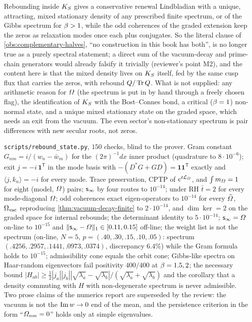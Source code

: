 \begin{observation}
\label{obs:rebound-both-halves-scope}
Rebounding inside $K_S$ gives a conservative renewal Lindbladian with a unique, attracting, mixed
stationary density of any prescribed finite spectrum, or of the Gibbs spectrum for $\beta>1$,
while the odd coherences of the graded extension keep the zeros as relaxation modes once each plus
conjugates. So the literal clause of \cref{obs:complementary-halves}, ``no construction in this book has
both'', is no longer true as a purely spectral statement; a direct sum of the vacuum-decay and
prime-chain generators would already falsify it trivially (reviewer's point M2), and the content here
is that the mixed density lives on $K_S$ itself, fed by the same cusp flux that carries the zeros,
with rebound $Q/\operatorname{Tr} Q$. What is not supplied: any arithmetic reason
for $\varOmega$ (the spectrum is put in by hand through a freely chosen flag), the identification of $K_S$
with the Bost--Connes bond, a critical ($\beta = 1$) non-normal state, and a unique mixed
stationary state on the graded space, which needs an exit from the vacuum. The even sector's
non-stationary spectrum is pair differences with new secular roots, not zeros.
\end{observation}

\begin{numerical}
\label{num:rebound-state}
\texttt{scripts/rebound\_state.py}, $150$ checks, blind to the prover. Gram constant $G_{nm} =
i/(w_n-\bar w_m)$ for the $(2\pi)^{-1}dx$ inner product (quadrature to $8\cdot10^{-6}$); exit $j =
-i\,\mathbf 1^{\mathsf T}$ in the mode basis with $-(D^{*}G+GD) = \mathbf 1\mathbf 1^{\mathsf T}$ exactly and
$\langle j,k_n\rangle = -i$ for every mode. Trace preservation, CPTP of $e^{t\mathcal L_{\varOmega}}$, and
$\int m_{\varOmega} = 1$ for eight (model, $\varOmega$) pairs; $\mathsf s_\infty$ by four routes to $10^{-14}$; under
RH $\bar t = 2$ for every mode-diagonal $\varOmega$; odd coherences exact eigen-operators to $10^{-14}$ for
every $\widetilde{\varOmega}$, $\Omega_{\mathrm{vac}}$ reproducing \cref{thm:vacuum-decay-finite} to $2\cdot10^{-14}$, and
$\dim\ker = 2$ on the graded space for internal rebounds; the determinant identity to $5\cdot10^{-14}$;
$\mathsf s_\infty = \varOmega$ on-line to $10^{-15}$ and $\|\mathsf s_\infty-\varOmega\|_1\in[0.11,0.15]$ off-line;
the weight list is not the spectrum (on-line, $N = 5$, $p = (.40,.30,.15,.10,.05)$: spectrum
$(.4256,.2957,.1441,.0973,.0374)$, discrepancy $6.4\%$) while the Gram formula holds to
$10^{-15}$; admissibility cone equals the orbit cone; Gibbs-like spectra on Haar-random eigenvectors
fail positivity $400/400$ at $\beta = 1.5, 2$; the necessary bound $|H_{ab}|\ge\tfrac12|j_a||j_b|
|\sqrt{\lambda_a}-\sqrt{\lambda_b}|/(\sqrt{\lambda_a}+\sqrt{\lambda_b})$ and the corollary that a density
commuting with $H$ with non-degenerate spectrum is never admissible. Two prose claims of the numerics
report are superseded by the review: the vacuum is not the $\operatorname{Im} w\to0$ end of the mean, and the
persistence criterion in the form ``$\varOmega_{nm} = 0$'' holds only at simple eigenvalues.
\end{numerical}
